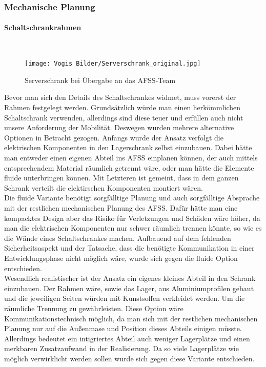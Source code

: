 \subsubsection{Mechanische Planung}

    \paragraph{Schaltschrankrahmen}\mbox{}\\
    \begin{wrapfigure}{r}{0.5\textwidth}
        \vspace{-30px}
        \texttt{[image: Vogis Bilder/Serverschrank\_original.jpg]}
        \caption{Serverschrank bei Übergabe an das AFSS-Team}
        \vspace{-10px}
        \label{fig:Serverschrank_original}
    \end{wrapfigure}
    Bevor man sich den Details des Schaltschrankes widmet, muss vorerst der Rahmen festgelegt werden. Grundsätzlich würde man einen herkömmlichen Schaltschrank verwenden, allerdings sind diese teuer und erfüllen auch nicht unsere Anforderung der Mobilität. Deswegen wurden mehrere alternative Optionen in Betracht gezogen. Anfangs wurde der Ansatz verfolgt die elektrischen Komponenten in den Lagerschrank selbst einzubauen. Dabei hätte man entweder einen eigenen Abteil ins AFSS einplanen können, der auch mittels entsprechendem Material räumlich getrennt wäre, oder man hätte die Elemente fluide unterbringen können. Mit Letzteren ist gemeint, dass in dem ganzen Schrank verteilt die elektirschen Komponenten montiert wären.\\
    Die fluide Variante benötigt sorgfälltige Planung und auch sorgfälltige Absprache mit der restlichen mechanischen Planung des AFSS. Dafür hätte man eine kompacktes Design aber das Risiko für Verletzungen und Schäden wäre höher, da man die elektrischen Komponenten nur schwer räumlich trennen könnte, so wie es die Wände eines Schaltschrankes machen. Aufbauend auf dem fehlenden Sicherheitsaspekt und der Tatsache, dass die benötigte Kommunikation in einer Entwicklungsphase nicht möglich wäre, wurde sich gegen die fluide Option entschieden.\\
    Wesendlich realistischer ist der Ansatz ein eigenes kleines Abteil in den Schrank einzubauen. Der Rahmen wäre, sowie das Lager, aus Aluminiumprofilen gebaut und die jeweiligen Seiten würden mit Kunstsoffen verkleidet werden. Um die räumliche Trennung zu gewährleisten. Diese Option wäre Kommunikationstechnisch möglich, da man sich mit der restlichen mechanischen Planung nur auf die Außenmase und Position dieses Abteils einigen müsste. Allerdings bedeutet ein intigriertes Abteil auch weniger Lagerplätze und einen merkbaren Zusatzaufwand in der Realisierung. Da so viele Lagerplätze wie möglich verwirklicht werden sollen wurde sich gegen diese Variante entschieden.\\
